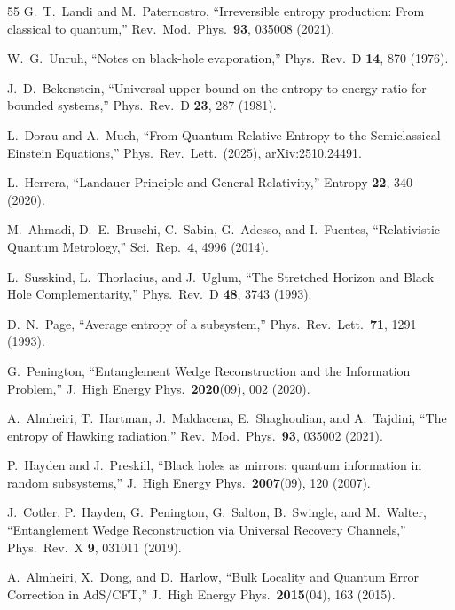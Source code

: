 \documentclass[prl,twocolumn,superscriptaddress,longbibliography,floatfix]{revtex4-2}
\begin{document}
\begin{thebibliography}{55}
G.~T.~Landi and M.~Paternostro,
``Irreversible entropy production: From classical to quantum,''
Rev.\ Mod.\ Phys.\ \textbf{93}, 035008 (2021).

W.~G.~Unruh,
``Notes on black-hole evaporation,''
Phys.\ Rev.\ D \textbf{14}, 870 (1976).

J.~D.~Bekenstein,
``Universal upper bound on the entropy-to-energy ratio for
bounded systems,''
Phys.\ Rev.\ D \textbf{23}, 287 (1981).


L.~Dorau and A.~Much,
``From Quantum Relative Entropy to the Semiclassical Einstein
Equations,''
Phys.\ Rev.\ Lett.\ (2025), arXiv:2510.24491.

L.~Herrera,
``Landauer Principle and General Relativity,''
Entropy \textbf{22}, 340 (2020).

M.~Ahmadi, D.~E.~Bruschi, C.~Sabin, G.~Adesso, and I.~Fuentes,
``Relativistic Quantum Metrology,''
Sci.\ Rep.\ \textbf{4}, 4996 (2014).


L.~Susskind, L.~Thorlacius, and J.~Uglum,
``The Stretched Horizon and Black Hole Complementarity,''
Phys.\ Rev.\ D \textbf{48}, 3743 (1993).

D.~N.~Page,
``Average entropy of a subsystem,''
Phys.\ Rev.\ Lett.\ \textbf{71}, 1291 (1993).

G.~Penington,
``Entanglement Wedge Reconstruction and the Information Problem,''
J.\ High Energy Phys.\ \textbf{2020}(09), 002 (2020).

A.~Almheiri, T.~Hartman, J.~Maldacena, E.~Shaghoulian, and
A.~Tajdini,
``The entropy of Hawking radiation,''
Rev.\ Mod.\ Phys.\ \textbf{93}, 035002 (2021).

P.~Hayden and J.~Preskill,
``Black holes as mirrors: quantum information in random
subsystems,''
J.\ High Energy Phys.\ \textbf{2007}(09), 120 (2007).

J.~Cotler, P.~Hayden, G.~Penington, G.~Salton, B.~Swingle,
and M.~Walter,
``Entanglement Wedge Reconstruction via Universal Recovery
Channels,''
Phys.\ Rev.\ X \textbf{9}, 031011 (2019).

A.~Almheiri, X.~Dong, and D.~Harlow,
``Bulk Locality and Quantum Error Correction in AdS/CFT,''
J.\ High Energy Phys.\ \textbf{2015}(04), 163 (2015).


\end{thebibliography}
\end{document}
